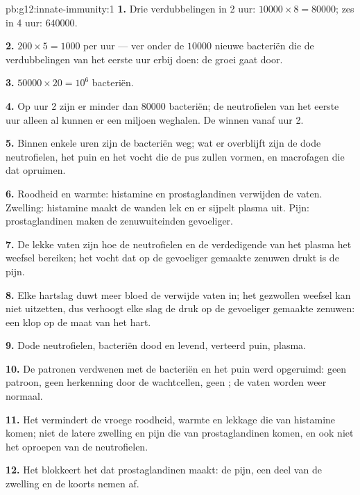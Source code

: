 \begin{solution}{pb:g12:innate-immunity:1}
\textbf{1.} Drie verdubbelingen in 2 uur: $\num{10000} \times 8 =
\num{80000}$; zes in 4 uur: $\num{640000}$.

\textbf{2.} $200 \times 5 = 1000$ per uur --- ver onder de
$\num{10000}$ nieuwe bacteriën die de verdubbelingen van het eerste uur
erbij doen: de groei gaat door.

\textbf{3.} $\num{50000} \times 20 = 10^6$ bacteriën.

\textbf{4.} Op uur 2 zijn er minder dan $\num{80000}$ bacteriën; de
neutrofielen van het eerste uur alleen al kunnen er een miljoen weghalen.
De  winnen vanaf uur 2.

\textbf{5.} Binnen enkele uren zijn de bacteriën weg; wat er overblijft
zijn de dode neutrofielen, het puin en het vocht die de pus zullen
vormen, en macrofagen die dat opruimen.

\textbf{6.} Roodheid en warmte: histamine en prostaglandinen verwijden de
vaten. Zwelling: histamine maakt de wanden lek en er sijpelt plasma uit.
Pijn: prostaglandinen maken de zenuwuiteinden gevoeliger.

\textbf{7.} De lekke vaten zijn hoe de neutrofielen en de verdedigende
 van het plasma het weefsel bereiken; het vocht dat op de
gevoeliger gemaakte zenuwen drukt is de pijn.

\textbf{8.} Elke hartslag duwt meer bloed de verwijde vaten in; het
gezwollen weefsel kan niet uitzetten, dus verhoogt elke slag de druk op de
gevoeliger gemaakte zenuwen: een klop op de maat van het hart.

\textbf{9.} Dode neutrofielen, bacteriën dood en levend, verteerd puin,
plasma.

\textbf{10.} De patronen verdwenen met de bacteriën en het puin werd
opgeruimd: geen patroon, geen herkenning door de wachtcellen, geen
; de vaten worden weer normaal.

\textbf{11.} Het vermindert de vroege roodheid, warmte en lekkage die van
histamine komen; niet de latere zwelling en pijn die van prostaglandinen
komen, en ook niet het oproepen van de neutrofielen.

\textbf{12.} Het blokkeert het  dat prostaglandinen maakt: de pijn,
een deel van de zwelling en de koorts nemen af.


\end{solution}
